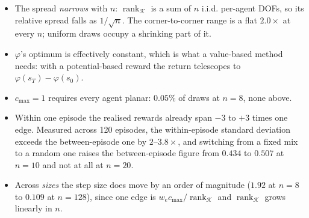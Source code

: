 \documentclass[11pt,a4paper]{article}
\newcommand{\rk}{\operatorname{rank}}
\begin{document}
\begin{itemize}\itemsep2pt
\item The spread \emph{narrows} with $n$: $\rk_{\mathcal K}$ is a sum of $n$ i.i.d. per-agent
      DOFs, so its relative spread falls as $1/\sqrt n$. The corner-to-corner range is a
      flat $2.0\times$ at every $n$; uniform draws occupy a shrinking part of it.
\item $\varphi$'s optimum is effectively constant, which is what a value-based method needs:
      with a potential-based reward the return telescopes to $\varphi(s_T)-\varphi(s_0)$.
\item $c_{\max}=1$ requires every agent planar: $0.05\%$ of draws at $n=8$, none above.
\item Within one episode the realised rewards already span $-3$ to $+3$ times one edge.
      Measured across 120 episodes, the within-episode standard deviation exceeds the
      between-episode one by $2$--$3.8\times$, and switching from a fixed mix to a random
      one raises the between-episode figure from $0.434$ to $0.507$ at $n=10$ and not at
      all at $n=20$.
\item Across \emph{sizes} the step size does move by an order of magnitude ($1.92$ at $n=8$
      to $0.109$ at $n=128$), since one edge is $w_ec_{\max}/\rk_{\mathcal K}$ and
      $\rk_{\mathcal K}$ grows linearly in $n$.
\end{itemize}
\end{document}
